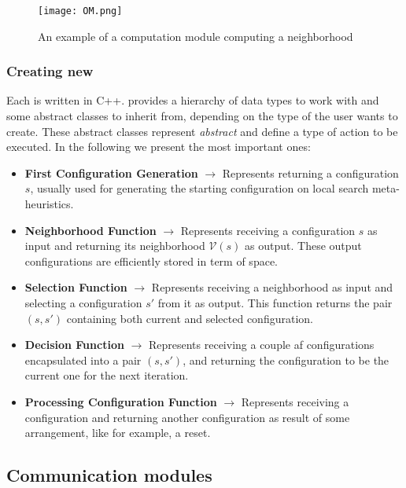 \begin{figure}
	\centering	
	\texttt{[image: OM.png]}
	\caption{An example of a computation module computing a neighborhood}\label{fig:om}
\end{figure}

\subsubsection{Creating new \oms}
\label{subsubsec:creatingoms}

Each \om{} is written in C++. \posl{} provides a hierarchy of data types to work with %
and some abstract classes to inherit from, depending on the type of \om{} the user wants to create. These abstract classes represent {\it abstract} \oms{} and define a type of action to be executed. In the following we present the most important ones:

\begin{itemize}
\item \textbf{First Configuration Generation} $\rightarrow$ Represents \oms{} returning a configuration $s$, usually used for generating the starting configuration on local search meta-heuristics. 
\item \textbf{Neighborhood Function} $\rightarrow$ Represents \oms{} receiving a configuration $s$ as input and returning its neighborhood $\mathcal{V}(s)$ as output. These output configurations are efficiently stored in term of space.
\item \textbf{Selection Function} $\rightarrow$ Represents \oms{} receiving a neighborhood as input and selecting a configuration $s'$ from it as output. This function returns the pair $(s, s')$ containing both current and selected configuration.
\item \textbf{Decision Function} $\rightarrow$ Represents \oms{} receiving a couple af configurations encapsulated into a pair $(s, s')$, and returning the configuration to be the current one for the next iteration. 
\item \textbf{Processing Configuration Function} $\rightarrow$ Represents \oms{} receiving a configuration and returning another configuration as result of some arrangement, like for example, a reset. 
\end{itemize}

\subsection{Communication modules}

